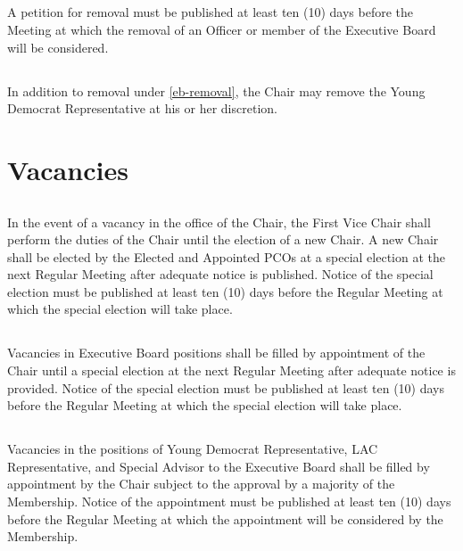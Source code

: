 \subsection{}
A petition for removal must be published at least ten (10) days before the Meeting at which the removal of an Officer or member of the Executive Board will be considered.

\subsection{}
In addition to removal under \autoref{eb-removal}, the Chair may remove the Young Democrat Representative at his or her discretion.

\section{Vacancies}
\subsection{}
In the event of a vacancy in the office of the Chair, the First Vice Chair shall perform the duties of the Chair until the election of a new Chair. A new Chair shall be elected by the Elected and Appointed PCOs at a special election at the next Regular Meeting after adequate notice is published. Notice of the special election must be published at least ten (10) days before the Regular Meeting at which the special election will take place.

\subsection{}
Vacancies in Executive Board positions shall be filled by appointment of the Chair until a special election at the next Regular Meeting after adequate notice is provided. Notice of the special election must be published at least ten (10) days before the Regular Meeting at which the special election will take place.

\subsection{}
Vacancies in the positions of Young Democrat Representative, LAC Representative, and Special Advisor to the Executive Board shall be filled by appointment by the Chair subject to the approval by a majority of the Membership. Notice of the appointment must be published at least ten (10) days before the Regular Meeting at which the appointment will be considered by the Membership.

